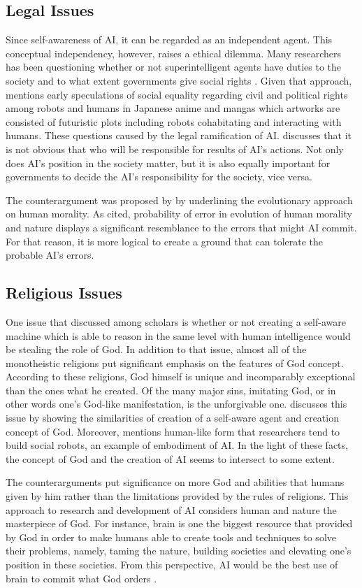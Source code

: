 \documentclass[man]{apa6}
\begin{document}
\subsection{Legal Issues}
Since self-awareness of AI, it can be regarded as an independent agent. This conceptual independency, however, raises a ethical dilemma. Many researchers has been questioning whether or not superintelligent agents have duties to the society and to what extent governments give social rights \cite{bob}. Given that approach, \cite{kerb} mentions early speculations of social equality regarding civil and political rights among robots and humans in Japanese anime and mangas which artworks are consisted of futuristic plots including robots cohabitating and interacting with humans. These questions caused by the legal ramification of AI.  discusses that it is not obvious that who will be responsible for results of AI's actions. Not only does AI's position in the society matter, but it is also equally important for governments to decide the AI's responsibility for the society, vice versa. \par
The counterargument was proposed by  by underlining the evolutionary approach on human morality. As  cited, probability of error in evolution of human morality and nature displays a significant resemblance to the errors that might AI commit. For that reason, it is more logical to create a ground that can tolerate the probable AI's errors.
\subsection{Religious Issues}
One issue that discussed among scholars is whether or not creating a self-aware machine which is able to reason in the same level with human intelligence would be stealing the role of God. In addition to that issue, almost all of the monotheistic religions put significant emphasis on the features of God concept. According to these religions, God himself is unique and incomparably exceptional than the ones what he created. Of the many major sins, imitating God, or in other words one's God-like manifestation, is the unforgivable one. discusses this issue by showing the similarities of creation of a self-aware agent and creation concept of God. Moreover,  mentions human-like form that researchers tend to build social robots, an example of embodiment of AI. In the light of these facts, the concept of God and the creation of AI seems to intersect to some extent.\par
The counterarguments put significance on more God and abilities that humans given by him rather than the limitations provided by the rules of religions. This approach to research and development of AI considers human and nature the masterpiece of God. For instance, brain is one the biggest resource that provided by God in order to make humans able to create tools and techniques to solve their problems, namely, taming the nature, building societies and elevating one's position in these societies. From this perspective, AI would be the best use of brain to commit what God orders \cite{gre}.
\end{document}
